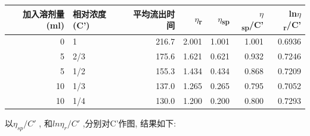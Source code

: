 \documentclass[11pt]{report}
\begin{document}
\begin{center}
\begin{tabular}{rlrrrrr}
加入溶剂量(ml) & 相对浓度(C') & 平均流出时间 & \(\eta\)\textsubscript{r} & \(\eta\)\textsubscript{sp} & \(\eta\)\textsubscript{sp}/C' & ln\(\eta\)\textsubscript{r}/C'\\
\hline
0 & 1 & 216.7 & 2.001 & 1.001 & 1.001 & 0.6936\\
5 & 2/3 & 175.6 & 1.621 & 0.621 & 0.932 & 0.7246\\
5 & 1/2 & 155.3 & 1.434 & 0.434 & 0.868 & 0.7209\\
10 & 1/3 & 137.0 & 1.265 & 0.265 & 0.795 & 0.7052\\
10 & 1/4 & 130.0 & 1.200 & 0.200 & 0.800 & 0.7293\\
\end{tabular}
\end{center}

以\(\eta_{sp}/C'\) , 和\(ln\eta_{r}/C'\) ,分别对C'作图, 结果如下:
\end{document}
